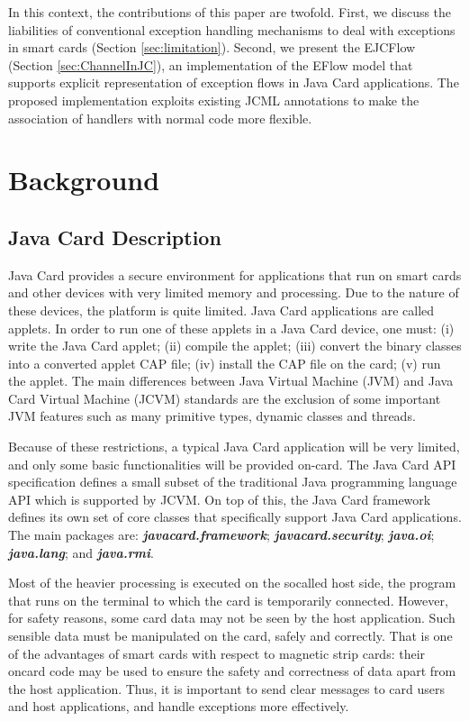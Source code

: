 \documentclass[10pt, conference, compsocconf]{IEEEtran}
\begin{document}
In this context, the contributions of this paper are twofold. First, we discuss
   the liabilities of conventional exception handling mechanisms to deal with
   exceptions in smart cards (Section \ref{sec:limitation}). Second, we present the EJCFlow
   (Section \ref{sec:ChannelInJC}), an implementation of the EFlow \cite{Cacho:2008}
   \cite{Cacho:2008b} model that supports explicit representation of exception
   flows in Java Card applications. The proposed implementation exploits existing JCML annotations to make the
   association of handlers with normal code more flexible.  
   
\section{Background}
\label{sec:background}

\subsection{Java Card Description}

Java Card provides a secure environment for applications that run on smart cards
and other devices with very limited memory and processing. Due to the nature of
these devices, the platform is quite limited. Java Card applications are called
applets. In order to run one of these applets in a Java Card device, one must:
(i) write the Java Card applet; (ii) compile the applet; (iii) convert the
binary classes into a converted applet CAP file; (iv) install the CAP file on
the card; (v) run the applet. The main differences between Java Virtual Machine
(JVM) and Java Card Virtual Machine (JCVM) standards are the exclusion of some
important JVM features such as many primitive types, dynamic classes and
threads.        

Because of these restrictions, a typical Java Card application will be very
limited, and only some basic functionalities will be provided on-card. The Java
Card API specification \cite{apiJavaCard} \cite{ortiz} \cite{sun2008} defines a
small subset of the traditional Java programming language API which is
supported by JCVM. On top of this, the Java Card
framework defines its own set of core classes that
specifically support Java Card applications. The main
packages \cite{Chen:2000} are: \textbf{\textit{javacard.framework}};
\textbf{\textit{javacard.security}}; \textbf{\textit{java.oi}};
\textbf{\textit{java.lang}}; and \textbf{\textit{java.rmi}}.

Most of the heavier processing is executed on the socalled
host side, the program that runs on the terminal to
which the card is temporarily connected. However, for
safety reasons, some card data may not be seen by the host
application. Such sensible data must be manipulated on the
card, safely and correctly. That is one of the advantages of
smart cards with respect to magnetic strip cards: their oncard
code may be used to ensure the safety and correctness
of data apart from the host application. Thus, it
is important to send clear messages to card users and host
applications, and handle exceptions more effectively.
\end{document}
